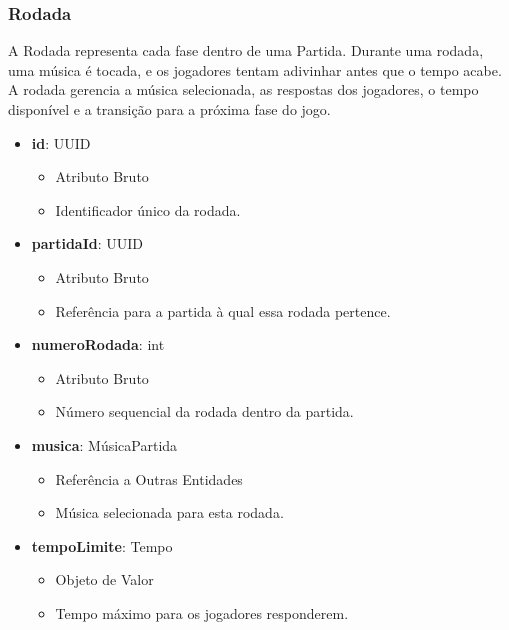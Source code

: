     \subsubsection{Rodada}
    A Rodada representa cada fase dentro de uma Partida. Durante uma rodada, uma música é tocada, e os jogadores tentam adivinhar antes que o tempo acabe. A rodada gerencia a música selecionada, as respostas dos jogadores, o tempo disponível e a transição para a próxima fase do jogo.
    \begin{itemize}
        \item \textbf{id}: UUID  
              \begin{itemize}
                  \item Atributo Bruto
                  \item Identificador único da rodada.
              \end{itemize}
    
        \item \textbf{partidaId}: UUID  
              \begin{itemize}
                  \item Atributo Bruto
                  \item Referência para a partida à qual essa rodada pertence.
              \end{itemize}
    
        \item \textbf{numeroRodada}: int  
              \begin{itemize}
                  \item Atributo Bruto
                  \item Número sequencial da rodada dentro da partida.
              \end{itemize}
    
        \item \textbf{musica}: MúsicaPartida  
              \begin{itemize}
                  \item Referência a Outras Entidades
                  \item Música selecionada para esta rodada.
              \end{itemize}
    
        \item \textbf{tempoLimite}: Tempo  
              \begin{itemize}
                  \item Objeto de Valor
                  \item Tempo máximo para os jogadores responderem.
              \end{itemize}
    

\end{itemize}

